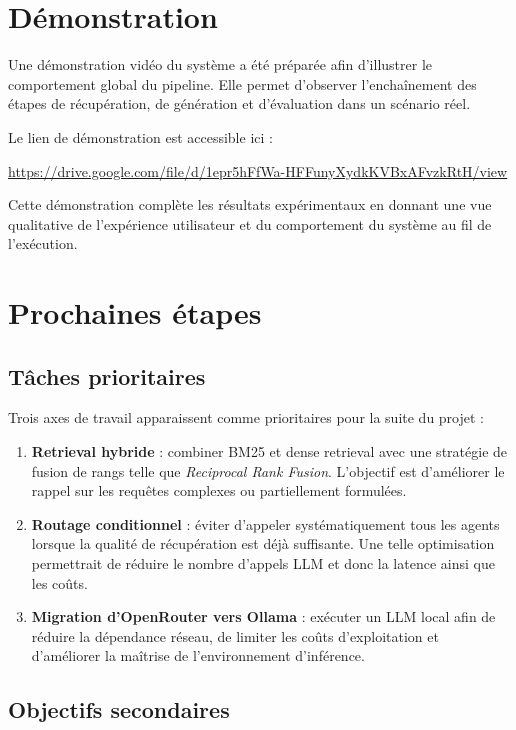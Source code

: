 \documentclass[12pt,a4paper]{report}
\begin{document}
\chapter{Démonstration}

Une démonstration vidéo du système a été préparée afin d'illustrer le comportement global du pipeline. Elle permet d'observer l'enchaînement des étapes de récupération, de génération et d'évaluation dans un scénario réel.

Le lien de démonstration est accessible ici :

\begin{center}
  \url{https://drive.google.com/file/d/1epr5hFfWa-HFFunyXydkKVBxAFvzkRtH/view}
\end{center}

Cette démonstration complète les résultats expérimentaux en donnant une vue qualitative de l'expérience utilisateur et du comportement du système au fil de l'exécution.

\chapter{Prochaines étapes}

\section{Tâches prioritaires}

Trois axes de travail apparaissent comme prioritaires pour la suite du projet :

\begin{enumerate}[leftmargin=1.2cm]
  \item \textbf{Retrieval hybride} : combiner BM25 et dense retrieval avec une stratégie de fusion de rangs telle que \textit{Reciprocal Rank Fusion}. L'objectif est d'améliorer le rappel sur les requêtes complexes ou partiellement formulées.
  \item \textbf{Routage conditionnel} : éviter d'appeler systématiquement tous les agents lorsque la qualité de récupération est déjà suffisante. Une telle optimisation permettrait de réduire le nombre d'appels LLM et donc la latence ainsi que les coûts.
  \item \textbf{Migration d'OpenRouter vers Ollama} : exécuter un LLM local afin de réduire la dépendance réseau, de limiter les coûts d'exploitation et d'améliorer la maîtrise de l'environnement d'inférence.
\end{enumerate}

\section{Objectifs secondaires}
\end{document}
